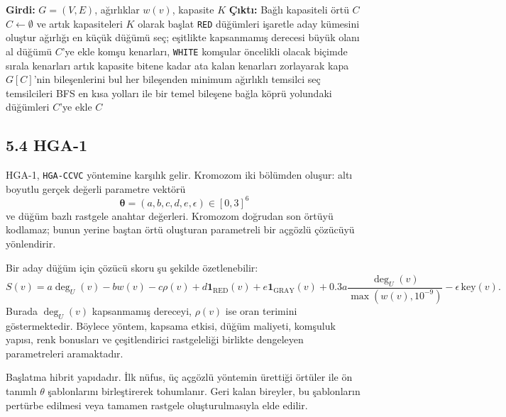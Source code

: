 \documentclass[11pt]{article}
\begin{document}
\begin{algorithm}[h]
\caption{Açgözlü-3 / GWCCVC}
\begin{algorithmic}[1]
\State \textbf{Girdi:} \(G=(V,E)\), ağırlıklar \(w(v)\), kapasite \(K\)
\State \textbf{Çıktı:} Bağlı kapasiteli örtü \(C\)
\State \(C\gets\emptyset\) ve artık kapasiteleri \(K\) olarak başlat
    \State \texttt{RED} düğümleri işaretle
    \State aday kümesini oluştur
    \State ağırlığı en küçük düğümü seç; eşitlikte kapsanmamış derecesi büyük olanı al
    \State düğümü \(C\)'ye ekle
    \State komşu kenarları, \texttt{WHITE} komşular öncelikli olacak biçimde sırala
    \State kenarları artık kapasite bitene kadar ata
\EndWhile
{}
    \State kalan kenarları zorlayarak kapa
\EndIf
\State \(G[C]\)'nin bileşenlerini bul
\State her bileşenden minimum ağırlıklı temsilci seç
\State temsilcileri BFS en kısa yolları ile bir temel bileşene bağla
\State köprü yolundaki düğümleri \(C\)'ye ekle
\State \Return \(C\)
\end{algorithmic}
\end{algorithm}

\subsection*{5.4 HGA-1}

HGA-1, \texttt{HGA-CCVC} yöntemine karşılık gelir. Kromozom iki bölümden oluşur: altı boyutlu gerçek değerli parametre vektörü
\[
\boldsymbol{\theta}=(a,b,c,d,e,\epsilon)\in[0,3]^6
\]
ve düğüm bazlı rastgele anahtar değerleri. Kromozom doğrudan son örtüyü kodlamaz; bunun yerine baştan örtü oluşturan parametreli bir açgözlü çözücüyü yönlendirir.

Bir aday düğüm için çözücü skoru şu şekilde özetlenebilir:
\[
S(v)=a\deg_U(v)-bw(v)-c\rho(v)+d\mathbf{1}_{\mathrm{RED}}(v)+e\mathbf{1}_{\mathrm{GRAY}}(v)+0.3a\frac{\deg_U(v)}{\max(w(v),10^{-9})}-\epsilon\,\mathrm{key}(v).
\]
Burada \(\deg_U(v)\) kapsanmamış dereceyi, \(\rho(v)\) ise oran terimini göstermektedir. Böylece yöntem, kapsama etkisi, düğüm maliyeti, komşuluk yapısı, renk bonusları ve çeşitlendirici rastgeleliği birlikte dengeleyen parametreleri aramaktadır.

Başlatma hibrit yapıdadır. İlk nüfus, üç açgözlü yöntemin ürettiği örtüler ile ön tanımlı \(\theta\) şablonlarını birleştirerek tohumlanır. Geri kalan bireyler, bu şablonların pertürbe edilmesi veya tamamen rastgele oluşturulmasıyla elde edilir.
\end{document}
